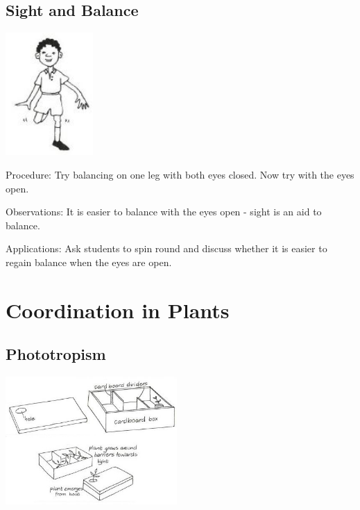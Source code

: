 \begin{multicols}{2}
\subsection{Sight and Balance}

\begin{center}
\includegraphics[width=0.25\textwidth]{./img/vso/sight-balance.jpg}
\end{center}

\begin{description*}
\item[Procedure:]{Try balancing on one leg with
both eyes closed. Now try with
the eyes open. }
\item[Observations:]{It is easier to
balance with the eyes open -
sight is an aid to balance.}
\item[Applications:]{Ask students to spin round and
discuss whether it is easier to
regain balance when the eyes are
open.}
\end{description*}

\columnbreak


\section*{Coordination in Plants}


\subsection{Phototropism}

\begin{center}
\includegraphics[width=0.49\textwidth]{./img/vso/phototropism.jpg}
\end{center}


\end{multicols}
